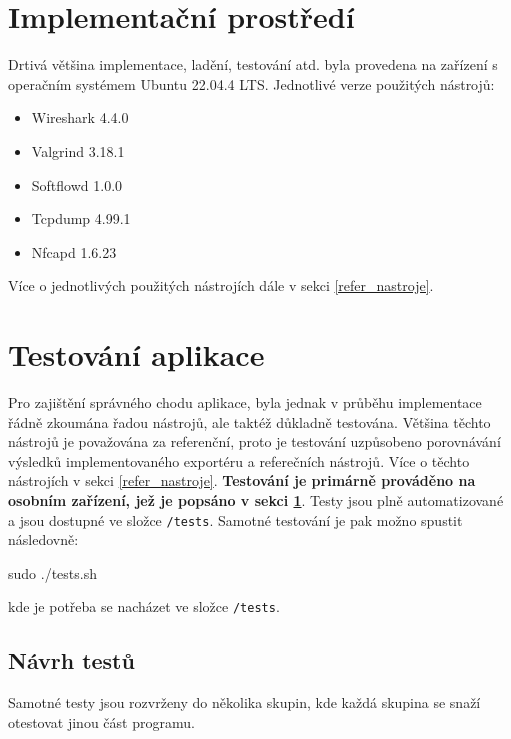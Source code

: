 \documentclass[11pt, a4paper, hidelinks]{article}[08.10.2023]
\begin{document}
    \section{Implementační prostředí}\label{prostredi}
    Drtivá většina implementace, ladění, testování atd. byla provedena na zařízení s operačním systémem Ubuntu 22.04.4 LTS. Jednotlivé verze použitých nástrojů:

    \begin{itemize}
        \item{Wireshark 4.4.0}
        \item{Valgrind 3.18.1}
        \item{Softflowd 1.0.0}
        \item{Tcpdump 4.99.1}
        \item{Nfcapd 1.6.23}
    \end{itemize}Více o jednotlivých použitých nástrojích dále v sekci \ref{refer_nastroje}.    
    \section{Testování aplikace}\label{test_zac}
    Pro zajištění správného chodu aplikace, byla jednak v průběhu implementace řádně zkoumána řadou nástrojů, ale taktéž důkladně testována. Většina těchto nástrojů je považována za referenční, proto je testování uzpůsobeno porovnávání výsledků implementovaného exportéru a referečních nástrojů. Více o těchto nástrojích v sekci \ref{refer_nastroje}. \textbf{Testování je primárně prováděno na osobním zařízení, jež je popsáno v sekci \ref{prostredi}}. Testy jsou plně automatizované a jsou dostupné ve složce \texttt{/tests}. Samotné testování je pak možno spustit následovně:

    \begin{center}
        sudo ./tests.sh
    \end{center}
    kde je potřeba se nacházet ve složce \texttt{/tests}.
    \subsection{Návrh testů}\label{test_navrh}
    Samotné testy jsou rozvrženy do několika skupin, kde každá skupina se snaží otestovat jinou část programu. 
\end{document}
